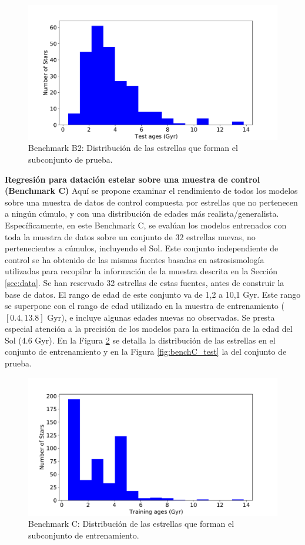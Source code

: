 \begin{figure}[H]
\begin{center}
 \includegraphics[width=0.8\linewidth]{Figuras/Experimentos/B_B2_test.pdf}
\end{center}
\caption{Benchmark B2: Distribución de las estrellas que forman el subconjunto de prueba.}
 \label{fig:benchB2_test}
\end{figure}

\textbf{Regresión para datación estelar sobre una muestra de control (Benchmark C)} {} Aquí se propone examinar el rendimiento de todos los modelos sobre una muestra de datos de control compuesta por estrellas que no pertenecen a ningún cúmulo, y con una distribución de edades más realista/generalista. Específicamente, en este Benchmark C, se evalúan los modelos entrenados con toda la muestra de datos sobre un conjunto de $32$ estrellas nuevas, no pertenecientes a cúmulos, incluyendo el Sol. Este conjunto independiente de control se ha obtenido de las mismas fuentes basadas en astrosismología utilizadas para recopilar la información de la muestra descrita en la Sección \ref{sec:data}. Se han reservado 32 estrellas de estas fuentes, antes de construir la base de datos. El rango de edad de este conjunto va de 1,2 a 10,1 Gyr. Este rango se superpone con el rango de edad utilizado en la muestra de entrenamiento ($[0.4, 13.8]$ Gyr), e incluye algunas edades nuevas no observadas. Se presta especial atención a la precisión de los modelos para la estimación de la edad del Sol (4.6 Gyr). En la Figura \ref{fig:benchC_train} se detalla la distribución de las estrellas en el conjunto de entrenamiento y en la Figura \ref{fig:benchC_test} la del conjunto de prueba.

\begin{figure}[H]
\begin{center}
 \includegraphics[width=0.8\linewidth]{Figuras/Experimentos/B_C_training.pdf}
\end{center}
\caption{Benchmark C: Distribución de las estrellas que forman el subconjunto de entrenamiento.}
 \label{fig:benchC_train}
\end{figure}

